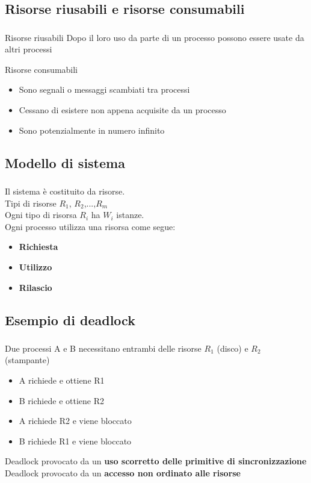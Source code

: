 \documentclass{beamer}
\newenvironment{mainframe}{
	\begin{frame}
		\frametitle{\insertsubsection}
		\framesubtitle{\insertsection}
	}{
	\end{frame}
}
\begin{document}
\subsection{Risorse riusabili e risorse consumabili}
\begin{mainframe}
	\begin{block}{Risorse riusabili}
		Dopo il loro uso da parte di un processo possono essere usate da altri processi
	\end{block}
	\begin{block}{Risorse consumabili}
		\begin{itemize}
			\item Sono segnali o messaggi scambiati tra processi
			\item Cessano di esistere non appena acquisite da un processo
			\item Sono potenzialmente in numero infinito
		\end{itemize}
	\end{block}
\end{mainframe}
\subsection{Modello di sistema}
\begin{mainframe}
	Il sistema è costituito da risorse.\\
	Tipi di risorse $R_1$, $R_2$,...,$R_m$\\
	Ogni tipo di risorsa $R_i$ ha $W_i$ istanze.\\
	Ogni processo utilizza una risorsa come segue:
	\begin{itemize}
		\item \textbf{Richiesta}
		\item \textbf{Utilizzo}
		\item \textbf{Rilascio}
	\end{itemize}
\end{mainframe}
\subsection{Esempio di deadlock}
\begin{mainframe}
	Due processi A e B necessitano entrambi delle risorse $R_1$ (disco) e $R_2$ (stampante)
	\begin{itemize}
		\item A richiede e ottiene R1
		\item B richiede e ottiene R2
		\item A richiede R2 e viene bloccato
		\item B richiede R1 e viene bloccato
	\end{itemize}
	Deadlock provocato da un \textbf{uso scorretto delle primitive di sincronizzazione}\\
	Deadlock provocato da un \textbf{accesso non ordinato alle risorse}
\end{mainframe}
\end{document}
